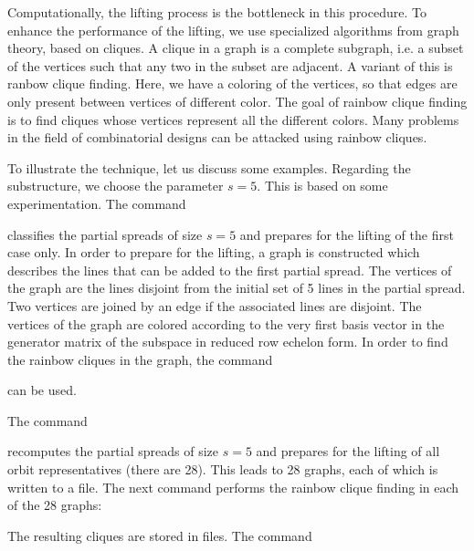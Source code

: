 \bigskip

Computationally, 
the lifting process is the bottleneck in this procedure. 
To enhance the performance of the lifting, 
we use specialized algorithms from graph theory, based on cliques. 
A clique in a graph is a complete subgraph, 
i.e. a subset of the vertices such that any two 
in the subset are adjacent.
A variant of this is ranbow clique finding. 
Here, we have a coloring of the vertices, 
so that edges are only present between vertices of different color.
The goal of rainbow clique finding 
is to find cliques whose vertices represent all the different colors.  
Many problems in the field of combinatorial designs can be attacked using rainbow cliques.

\bigskip


To illustrate the technique, let us discuss some examples.
Regarding the substructure, 
we choose the parameter $s=5.$ 
This is based on some experimentation.
The command 


classifies the partial spreads of size $s=5$ and 
prepares for the lifting of the first case only. 
In order to prepare for the lifting, a graph is constructed which 
describes the lines that can be added to the first partial spread. 
The vertices of the graph are the lines 
disjoint from the initial set of 5 lines in the partial spread. 
Two vertices are joined by an edge if the associated lines are disjoint. 
The vertices of the graph are colored according to the very first basis vector in the 
generator matrix of the subspace in reduced row echelon form.
In order to find the rainbow cliques in the graph, the command 


can be used. 

\bigskip

The command 


recomputes the partial spreads of size $s=5$ and prepares for the lifting of all 
orbit representatives (there are 28). 
This leads to 28 graphs, each of which is 
written to a file.
The next command performs the rainbow clique finding in each of the 28 graphs:


The resulting cliques are stored in files. 
The command 

